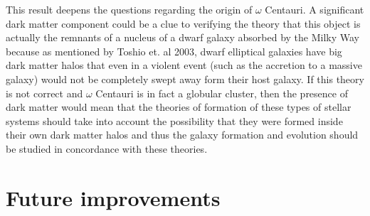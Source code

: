 This result deepens the questions regarding the origin of $\omega$ Centauri. A significant dark matter component could be a clue to verifying the theory that this object is actually the remnants of a nucleus of a dwarf galaxy absorbed by the Milky Way because as mentioned by Toshio et. al 2003, dwarf elliptical galaxies have big dark matter halos that even in a violent event (such as the accretion to a massive galaxy) would not be completely swept away form their host galaxy. If this theory is not correct and $\omega$ Centauri is in fact a globular cluster, then the presence of dark matter would mean that the theories of formation of these types of stellar systems should take into account the possibility that they were formed inside their own dark matter halos and thus the galaxy formation and evolution should be studied in concordance with these theories. 

\section{Future improvements}

